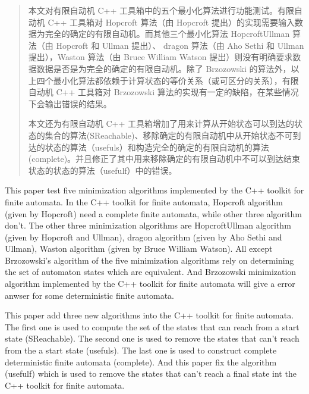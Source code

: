 \begin{abstract}
  本文对有限自动机 C++ 工具箱中的五个最小化算法进行功能测试。有限自动机 C++ 工具箱对 Hopcroft 算法（由 Hopcroft 提出）的实现需要输入数据为完全的确定的有限自动机。而其他三个最小化算法 HopcroftUllman 算法（由 Hopcroft 和 Ullman 提出）、 dragon 算法（由 Aho Sethi 和 Ullman 提出），Waston 算法（由 Bruce William Watson 提出）则没有明确要求数据数据是否是为完全的确定的有限自动机。除了 Brzozowski 的算法外，以上四个最小化算法都依赖于计算状态的等价关系（或可区分的关系），有限自动机 C++ 工具箱对 Brzozowski 算法的实现有一定的缺陷，在某些情况下会输出错误的结果。

  本文还为有限自动机 C++ 工具箱增加了用来计算从开始状态可以到达的状态的集合的算法(SReachable)、移除确定的有限自动机中从开始状态不可到达的状态的算法（usefuls）和构造完全的确定的有限自动机的算法(complete)。并且修正了其中用来移除确定的有限自动机中不可以到达结束状态的状态的算法（usefulf）中的错误。

\end{abstract}

\begin{enabstract}
  This paper test five minimization algorithms implemented by the C++ toolkit for finite automata. In the C++ toolkit for finite automata, Hopcroft algorithm (given by Hopcroft) need a complete finite automata, while other three algorithm don't. The other three minimization algorithms are HopcroftUllman algorithm (given by Hopcroft and Ullman), dragon algorithm (given by Aho Sethi and Ullman), Waston algorithm (given by Bruce William Watson). All except Brzozowski's algorithm of the five minimization algorithms rely on determining the set of automaton states which are equivalent. And Brzozowski minimization algorithm implemented by the C++ toolkit for finite automata will give a error anwser for some deterministic finite automata.
  
  This paper add three new algorithms into the C++ toolkit for finite automata. The first one is used to compute the set of the states that can reach from a start state (SReachable). The second one is used to remove the states that can't reach from the a start state (usefuls). The last one is used to construct complete deterministic finite automata (complete). And this paper fix the algorithm (usefulf) which is used to remove the states that can't reach a final state int the C++ toolkit for finite automata.
\end{enabstract}
